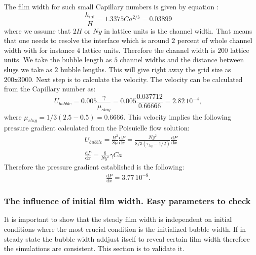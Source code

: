 \documentclass{article}
\begin{document}
The film width for such small Capillary numbers is given by equation
\cite{giavedoni-numerical}:
\begin{equation}
\frac{h_{\inf}}{H}=1.3375 Ca^{2/3}=0.03899
\end{equation}
where we assume that $2 H$ or $Ny$ in lattice units is the channel width. That
means that one needs to resolve the interface which is around $2$ percent of
whole channel width with for instance $4$ lattice units. Therefore the channel
width is $200$ lattice units. We take the bubble length as $5$ channel widths
and the distance between slugs we take as $2$ bubble lengths. This will give
right away the grid size as $200\mathrm{x}3000$. Next step is to calculate the
velocity. The velocity can be calculated from the Capillary number as:
\begin{equation}
U_{bubble}=0.005 \frac{\gamma}{\mu_{slug}}=0.005 \frac{0.037712}{0.66666}=2.82\,
10^{-4},
\end{equation}
where $\mu_{slug}=1/3 (2.5-0.5)=0.6666$.
This velocity implies the following pressure gradient calculated from the
Poisuielle flow solution:
\begin{equation}
\begin{aligned}
&U_{bubble}=\frac{H^2}{8\mu} \frac{\mathrm{d}P}{\mathrm{d}x}=\frac{Ny^2}{8/3
(\tau_{liq}-1/2)}\frac{\mathrm{d}P}{\mathrm{d}x}\\
&\frac{\mathrm{d}P}{\mathrm{d}x}=\frac{8}{Ny^2}\gamma Ca
\end{aligned}
\end{equation}
Therefore the pressure gradient established is the following:
\begin{equation}
\begin{aligned}
\frac{\mathrm{d}P}{\mathrm{d}x}=3.77\, 10^{-8}.
\end{aligned}
\end{equation}

\subsubsection{The influence of initial film width. Easy parameters to check}
It is important to show that the steady film width is independent on initial
conditions where the most crucial condition is the initialized bubble width. If
in steady state the bubble width addjust itself to reveal certain film width
therefore the simulations are consistent. This section is to validate it.
\end{document}
